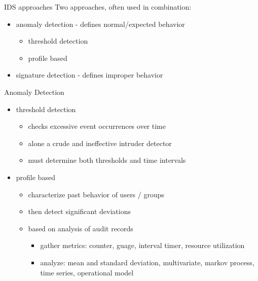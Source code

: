 \documentclass{beamer}
\begin{document}
\begin{frame}{IDS approaches}
  Two approaches, often used in combination: 
    \begin{itemize}
    \item anomaly detection - defines normal/expected behavior 
      \begin{itemize}
      \item threshold detection 
      \item profile based 
      \end{itemize}
    \item signature detection - defines improper behavior
    \end{itemize}
\end{frame}

\begin{frame}{Anomaly Detection}
  \begin{itemize}
  \item threshold detection 
    \begin{itemize}
    \item checks excessive event occurrences over time 
    \item alone a crude and ineffective intruder detector 
    \item must determine both thresholds and time intervals 
    \end{itemize}
  \item profile based 
    \begin{itemize}
    \item characterize past behavior of users / groups 
    \item then detect significant deviations 
    \item based on analysis of audit records 
      \begin{itemize}
      \item gather metrics: counter, guage, interval timer, resource utilization
      \item analyze: mean and standard deviation, multivariate, markov 
        process, time series, operational model 
      \end{itemize}
    \end{itemize}
  \end{itemize}
\end{frame}
\end{document}
